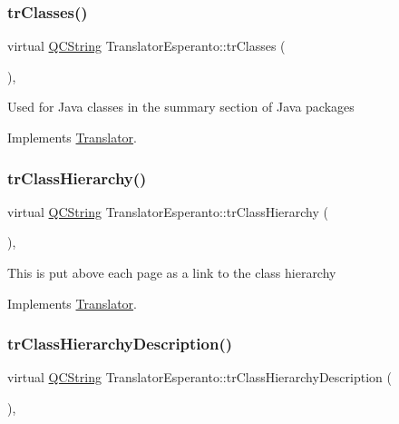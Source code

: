 \subsubsection{\texorpdfstring{trClasses()}{trClasses()}}
{\footnotesize\ttfamily virtual \mbox{\hyperlink{class_q_c_string}{Q\+C\+String}} Translator\+Esperanto\+::tr\+Classes (\begin{DoxyParamCaption}{ }\end{DoxyParamCaption})\hspace{0.3cm}{\ttfamily [inline]}, {\ttfamily [virtual]}}

Used for Java classes in the summary section of Java packages 

Implements \mbox{\hyperlink{class_translator}{Translator}}.

\mbox{\label{class_translator_esperanto_a94649e92409f1ded8916d04e80f5c67b}} 
\subsubsection{\texorpdfstring{trClassHierarchy()}{trClassHierarchy()}}
{\footnotesize\ttfamily virtual \mbox{\hyperlink{class_q_c_string}{Q\+C\+String}} Translator\+Esperanto\+::tr\+Class\+Hierarchy (\begin{DoxyParamCaption}{ }\end{DoxyParamCaption})\hspace{0.3cm}{\ttfamily [inline]}, {\ttfamily [virtual]}}

This is put above each page as a link to the class hierarchy 

Implements \mbox{\hyperlink{class_translator}{Translator}}.

\mbox{\label{class_translator_esperanto_ad2ab174a287912a744a21ddedc366116}} 
\subsubsection{\texorpdfstring{trClassHierarchyDescription()}{trClassHierarchyDescription()}}
{\footnotesize\ttfamily virtual \mbox{\hyperlink{class_q_c_string}{Q\+C\+String}} Translator\+Esperanto\+::tr\+Class\+Hierarchy\+Description (\begin{DoxyParamCaption}{ }\end{DoxyParamCaption})\hspace{0.3cm}{\ttfamily [inline]}, {\ttfamily [virtual]}}

